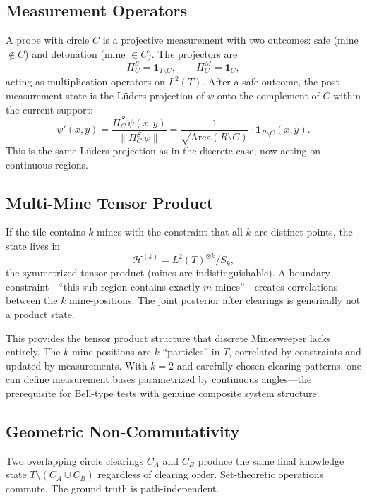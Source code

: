 \documentclass[12pt,a4paper]{article}
\theoremstyle{definition}
\theoremstyle{remark}
\newcommand{\Hil}{\mathcal{H}}
\newcommand{\Area}{\mathrm{Area}}
\begin{document}
\subsection{Measurement Operators}

A probe with circle $C$ is a projective measurement with two outcomes: safe (mine $\notin C$) and detonation (mine $\in C$).  The projectors are
\[
  \Pi_C^S = \mathbf{1}_{T \setminus C}, \qquad \Pi_C^M = \mathbf{1}_C,
\]
acting as multiplication operators on $L^2(T)$.  After a safe outcome, the post-measurement state is the Lüders projection of $\psi$ onto the complement of $C$ within the current support:
\[
  \psi'(x,y) = \frac{\Pi_C^S \, \psi(x,y)}{\|\Pi_C^S \, \psi\|} = \frac{1}{\sqrt{\Area(R \setminus C)}} \cdot \mathbf{1}_{R \setminus C}(x,y).
\]
This is the same Lüders projection as in the discrete case, now acting on continuous regions.

\subsection{Multi-Mine Tensor Product}
\label{sec:tensor}

If the tile contains $k$ mines with the constraint that all $k$ are distinct points, the state lives in
\begin{equation}\label{eq:tensor}
  \Hil^{(k)} = L^2(T)^{\otimes k} / S_k,
\end{equation}
the symmetrized tensor product (mines are indistinguishable).  A boundary constraint---``this sub-region contains exactly $m$ mines''---creates correlations between the $k$ mine-positions.  The joint posterior after clearings is generically not a product state.

This provides the tensor product structure that discrete Minesweeper lacks entirely.  The $k$ mine-positions are $k$ ``particles'' in $T$, correlated by constraints and updated by measurements.  With $k = 2$ and carefully chosen clearing patterns, one can define measurement bases parametrized by continuous angles---the prerequisite for Bell-type tests with genuine composite system structure.

\subsection{Geometric Non-Commutativity}
\label{sec:geometric-noncommute}

Two overlapping circle clearings $C_A$ and $C_B$ produce the same final knowledge state $T \setminus (C_A \cup C_B)$ regardless of clearing order.  Set-theoretic operations commute.  The ground truth is path-independent.
\end{document}
